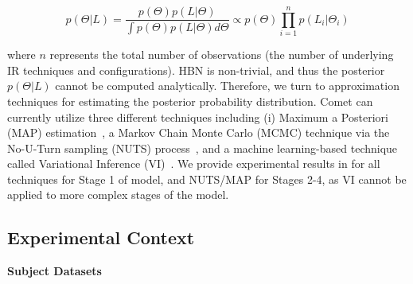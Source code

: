 \vspace{-0.3cm}
\begin{equation} \label{eq_bayes}
p(\Theta|L) = \dfrac{p(\Theta)p(L|\Theta)}{\int p(\Theta)p(L|\Theta)d\Theta} \propto p(\Theta) \prod\limits_{i=1}^n p(L_i|\Theta_i)
\end{equation}

\noindent where $n$ represents the total number of observations (\ie the number of underlying IR techniques and configurations).  \Comets HBN is non-trivial, and thus the posterior $p(\Theta|L)$ cannot be computed analytically. Therefore, we turn to approximation techniques for estimating the posterior probability distribution. Comet can currently utilize three different techniques including (i) Maximum a Posteriori (MAP) estimation~\citep{Bassett2018MaximumEstimators}, a Markov Chain Monte Carlo (MCMC) technique via the No-U-Turn sampling (NUTS) process~\citep{Hoffman2011TheCarlo}, and a machine learning-based technique called Variational Inference (VI)~\citep{Bishop:2006}. We provide experimental results in  for all techniques for Stage 1 of \Comets model, and NUTS/MAP for Stages 2-4, as VI cannot be applied to more complex stages of the model.

\subsection{Experimental Context}
\label{sub:exp-context}

\textbf{Subject Datasets}